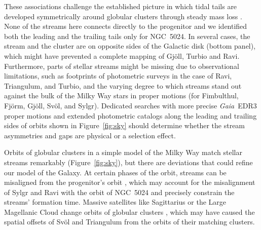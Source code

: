 \documentclass[twocolumn]{aastex63}
\newcommand{\gaia}{\textsl{Gaia}}
\begin{document}
These associations challenge the established picture in which tidal tails are developed symmetrically around globular clusters through steady mass loss \citep[e.g.,][]{kuepper2010}.
None of the streams here connects directly to the progenitor and we identified both the leading and the trailing tails only for NGC~5024.
In several cases, the stream and the cluster are on opposite sides of the Galactic disk (bottom panel), which might have prevented a complete mapping of Gj\" oll, Turbio and Ravi.
Furthermore, parts of stellar streams might be missing due to observational limitations, such as footprints of photometric surveys in the case of Ravi, Triangulum, and Turbio, and the varying degree to which streams stand out against the bulk of the Milky Way stars in proper motions (for Fimbulthul, Fj\" orm, Gj\" oll, Sv\" ol, and Sylgr).
Dedicated searches with more precise \gaia\ EDR3 proper motions \citep{gaiaedr3} and extended photometric catalogs \citep{dey2019} along the leading and trailing sides of orbits shown in Figure~\ref{fig:sky} should determine whether the stream asymmetries and gaps are physical or a selection effect.


Orbits of globular clusters in a simple model of the Milky Way match stellar streams remarkably (Figure~\ref{fig:sky}), but there are deviations that could refine our model of the Galaxy.
At certain phases of the orbit, streams can be misaligned from the progenitor's orbit \citep{sanders2013}, which may account for the misalignment of Sylgr and Ravi with the orbit of NGC~5024 and precisely constrain the streams' formation time.
Massive satellites like Sagittarius or the Large Magellanic Cloud change orbits of globular clusters \citep{garrow2020}, which may have caused the spatial offsets of Sv\" ol and Triangulum from the orbits of their matching clusters.

\end{document}
